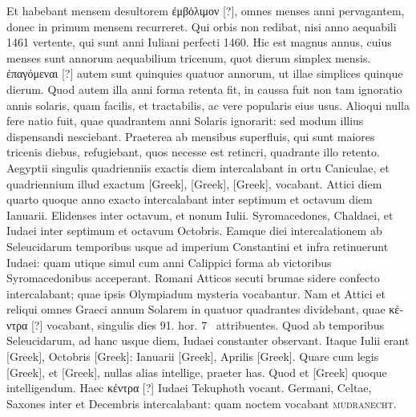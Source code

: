 Et habebant mensem desultorem
\textgreek{ἐμβὀλιμον [?]}, omnes menses anni pervagantem, donec in primum
mensem recurreret.
Qui orbis non redibat, nisi anno aequabili 1461
vertente, qui sunt anni Iuliani perfecti 1460.
Hic est magnus annus,
cuius menses sunt annorum aequabilium tricenum, quot dierum simplex
mensis.
\textgreek{ἐπαγόμεναι [?]} autem sunt quinquies quatuor annorum, ut
illae simplices quinque dierum.
Quod autem illa anni forma retenta
fit, in caussa fuit non tam ignoratio annis solaris,
 quam facilis, et tractabilis,
ac vere popularis eius usus.
Alioqui nulla fere natio fuit, quae
quadrantem anni Solaris ignorarit: sed modum illius dispensandi
nesciebant.
Praeterea ab mensibus superfluis, qui sunt maiores tricenis
diebus, refugiebant, quos necesse est retincri,
 quadrante illo retento.
Aegyptii singulis quadrienniis exactis diem intercalabant
 in ortu Caniculae,
et quadriennium illud exactum \textgreek{[Greek]}, \textgreek{[Greek]},
\textgreek{[Greek]}, vocabant.
Attici diem quarto quoque anno exacto intercalabant
inter septimum et octavum diem Ianuarii.
Elidenses inter
octavum, et nonum Iulii.
Syromacedones, Chaldaei, et Iudaei inter
septimum et octavum Octobris.
Eamque diei intercalationem ab Seleucidarum
temporibus usque ad imperium Constantini et infra retinuerunt
Iudaei: quam utique simul cum anni Calippici forma ab victoribus
Syromacedonibus acceperant.
Romani Atticos secuti brumae
sidere confecto intercalabant; quae ipsis Olympiadum mysteria vocabantur.
Nam et Attici et reliqui omnes Graeci annum Solarem in
quatuor quadrantes dividebant, quae \textgreek{κέντρα [?]}
 vocabant, singulis dies 91.
hor. 7~ attribuentes.
Quod ab temporibus Seleucidarum, ad hanc usque
diem, Iudaei constanter observant.
Itaque  Iulii erant \textgreek{[Greek]},
 Octobris \textgreek{[Greek]}:
  Ianuarii \textgreek{[Greek]}, 
Aprilis \textgreek{[Greek]}.
Quare cum legis \textgreek{[Greek]}, et \textgreek{[Greek]},
nullas alias intellige, praeter has.
Quod et \textgreek{[Greek]} quoque intelligendum.
Haec \textgreek{κέντρα [?]} Iudaei Tekuphoth vocant.
Germani, Celtae,
Saxones inter  et  Decembris intercalabant:
 quam noctem
vocabant \textsc{mudranecht}.
